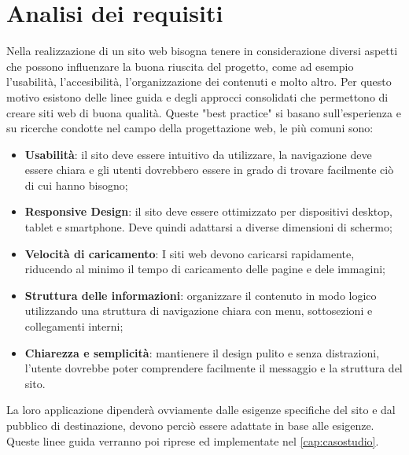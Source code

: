 \documentclass[target=bach,aauheader=]{thud}
\begin{document}
\section{Analisi dei requisiti}
Nella realizzazione di un sito web bisogna tenere in considerazione diversi aspetti che possono influenzare la buona riuscita del progetto, come ad esempio l'usabilità, l'accesibilità, l'organizzazione dei contenuti e molto altro.
Per questo motivo esistono delle linee guida e degli approcci consolidati che permettono di creare siti web di buona qualità. Queste "best practice" si basano sull'esperienza e su ricerche condotte nel campo della progettazione web, le più comuni sono:
\begin{itemize}
    \item \textbf{Usabilità}: il sito deve essere intuitivo da utilizzare, la navigazione deve essere chiara e gli utenti dovrebbero essere in grado di trovare facilmente ciò di cui hanno bisogno;
    \item \textbf{Responsive Design}: il sito deve essere ottimizzato per dispositivi desktop, tablet e smartphone. Deve quindi adattarsi a diverse dimensioni di schermo;
    \item \textbf{Velocità di caricamento}: I siti web devono caricarsi rapidamente, riducendo al minimo il tempo di caricamento delle pagine e dele immagini;
    \item \textbf{Struttura delle informazioni}: organizzare il contenuto in modo logico utilizzando una struttura di navigazione chiara con menu, sottosezioni e collegamenti interni;
    \item \textbf{Chiarezza e semplicità}: mantienere il design pulito e senza distrazioni, l'utente dovrebbe poter comprendere facilmente il messaggio e la struttura del sito.
\end{itemize}
La loro applicazione dipenderà ovviamente dalle esigenze specifiche del sito e dal pubblico di destinazione, devono perciò essere adattate in base alle esigenze.
\newline Queste linee guida verranno poi riprese ed implementate nel \cref{cap:casostudio}.

\end{document}
